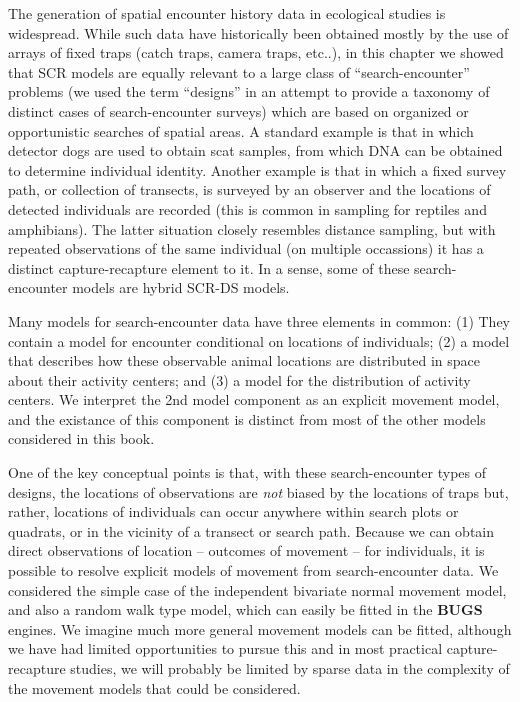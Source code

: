 The generation of spatial encounter history data in ecological studies
is widespread. While such data have historically been obtained mostly
by the use of arrays of fixed traps (catch traps, camera traps,
etc..), in this chapter we showed that SCR models are equally relevant
to a large class of ``search-encounter'' problems (we used the term
``designs'' in an attempt to provide a taxonomy of distinct cases of
search-encounter surveys) which are based on organized or
opportunistic searches of spatial areas. A standard example is that in
which detector dogs are used to obtain scat samples, from which DNA
can be obtained to determine individual identity.  Another example is
that in which a fixed survey path, or collection of transects, is
surveyed by an observer and the locations of detected individuals are
recorded (this is common in sampling for reptiles and amphibians).
The latter situation closely resembles distance sampling,
but with repeated observations of the same individual (on multiple
occassions) it has a distinct capture-recapture element to it. In a
sense, some of these search-encounter models are hybrid SCR-DS models.

Many models for search-encounter data have three elements in common:
(1) They contain a model for encounter conditional on locations of
individuals; (2) a model that describes how these observable animal
locations are distributed in space about their activity centers; and
(3) a model for the distribution of activity centers.  We interpret
the 2nd model component as an explicit movement model, and the
existance of this component is distinct from most of the other models
considered in this book.

One of the key conceptual points is that, with these search-encounter
types of designs, the locations of observations are {\it not} biased
by the locations of traps but, rather, locations of individuals can
occur anywhere within search plots or quadrats, or in the vicinity of
a transect or search path.  Because we can obtain direct observations
of location -- outcomes of movement -- for individuals, it is possible
to resolve explicit models of movement from search-encounter data.  We
considered the simple case of the independent bivariate normal
movement model, and also a random walk type model, which can easily be
fitted in the {\bf BUGS} engines.  We imagine much more general
movement models can be fitted, although we have had limited
opportunities to pursue this and in most practical capture-recapture
studies, we will probably be limited by sparse data in the complexity
of the movement models that could be considered.


